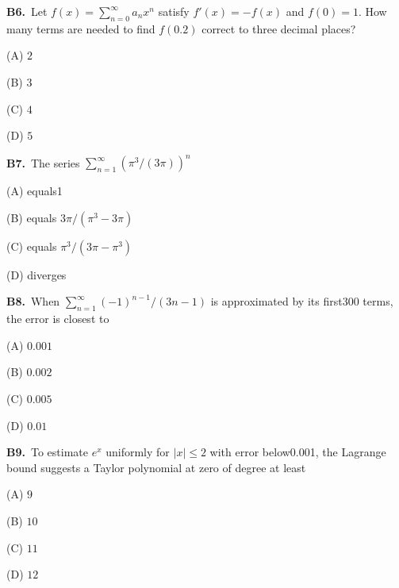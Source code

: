 \documentclass[11pt]{article}
\begin{document}
\bigskip\noindent\textbf{B6.}\ Let $f(x)=\sum_{n=0}^\infty a_nx^n$ satisfy $f\prime(x)=-f(x)$ and $f(0)=1$. How many terms are needed to find $f(0.2)$ correct to three decimal places?
\begin{list}{}{\setlength{\leftmargin}{3em}\setlength{\labelwidth}{2.5em}\setlength{\itemsep}{0pt}\setlength{\topsep}{2pt}}
\item[(A)] $2$
\item[(B)] $3$
\item[(C)] $4$
\item[(D)] $5$
\end{list}

\bigskip\noindent\textbf{B7.}\ The series $\sum_{n=1}^\infty(\pi^3/(3\pi))^n$
\begin{list}{}{\setlength{\leftmargin}{3em}\setlength{\labelwidth}{2.5em}\setlength{\itemsep}{0pt}\setlength{\topsep}{2pt}}
\item[(A)] equals1
\item[(B)] equals $3\pi/(\pi^3-3\pi)$
\item[(C)] equals $\pi^3/(3\pi-\pi^3)$
\item[(D)] diverges
\end{list}

\bigskip\noindent\textbf{B8.}\ When $\sum_{n=1}^\infty(-1)^{n-1}/(3n-1)$ is approximated by its first300 terms, the error is closest to
\begin{list}{}{\setlength{\leftmargin}{3em}\setlength{\labelwidth}{2.5em}\setlength{\itemsep}{0pt}\setlength{\topsep}{2pt}}
\item[(A)] $0.001$
\item[(B)] $0.002$
\item[(C)] $0.005$
\item[(D)] $0.01$
\end{list}

\bigskip\noindent\textbf{B9.}\ To estimate $e^x$ uniformly for $|x|\leq2$ with error below0.001, the Lagrange bound suggests a Taylor polynomial at zero of degree at least
\begin{list}{}{\setlength{\leftmargin}{3em}\setlength{\labelwidth}{2.5em}\setlength{\itemsep}{0pt}\setlength{\topsep}{2pt}}
\item[(A)] $9$
\item[(B)] $10$
\item[(C)] $11$
\item[(D)] $12$
\end{list}
\end{document}
